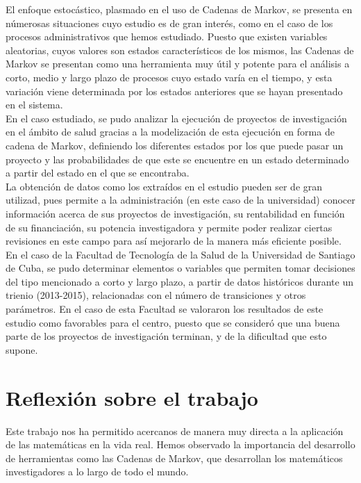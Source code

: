\documentclass[10pt,a4paper]{article}
\begin{document}
El enfoque estocástico, plasmado en el uso de Cadenas de Markov, se presenta en númerosas situaciones cuyo estudio es de gran interés, como en el caso de los procesos administrativos que hemos estudiado. Puesto que existen variables aleatorias, cuyos valores son estados característicos de los mismos, las Cadenas de Markov se presentan como una herramienta muy útil y potente para el análisis a corto, medio y largo plazo de procesos cuyo estado varía en el tiempo, y esta variación viene determinada por los estados anteriores que se hayan presentado en el sistema.\\

En el caso estudiado, se pudo analizar la ejecución de proyectos de investigación en el ámbito de salud gracias a la modelización de esta ejecución en forma de cadena de Markov, definiendo los diferentes estados por los que puede pasar un proyecto y las probabilidades de que este se encuentre en un estado determinado a partir del estado en el que se encontraba.\\

La obtención de datos como los extraídos en el estudio pueden ser de gran utilizad, pues permite a la administración (en este caso de la universidad) conocer información acerca de sus proyectos de investigación, su rentabilidad en función de su financiación, su potencia investigadora y permite poder realizar ciertas revisiones en este campo para así mejorarlo de la manera más eficiente posible. \\

En el caso de la Facultad de Tecnología de la Salud de la Universidad de Santiago de Cuba, se pudo determinar elementos o variables que permiten tomar decisiones del tipo mencionado a corto y largo plazo, a partir de datos históricos durante un trienio (2013-2015), relacionadas con el número de transiciones y otros parámetros. En el caso de esta Facultad se valoraron los resultados de este estudio como favorables para el centro, puesto que se consideró que una buena parte de los proyectos de investigación terminan, y de la dificultad que esto supone. \\

\section{Reflexión sobre el trabajo}

Este trabajo nos ha permitido acercanos de manera muy directa a la aplicación de las matemáticas en la vida real. Hemos observado la importancia del desarrollo de herramientas como las Cadenas de Markov, que desarrollan los matemáticos investigadores a lo largo de todo el mundo. \\
\end{document}
